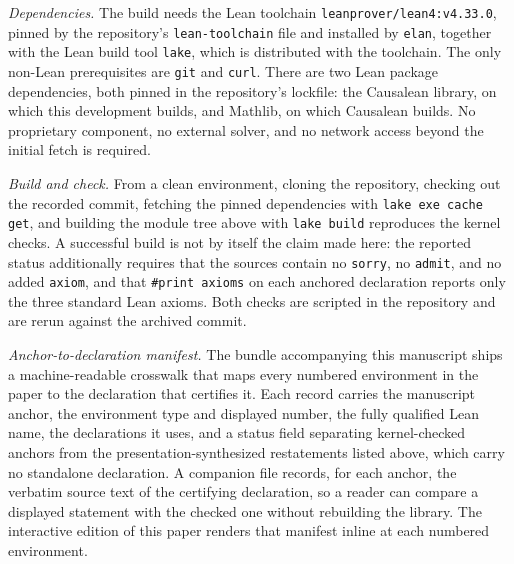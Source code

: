 \emph{Dependencies.}  The build needs the Lean toolchain \texttt{leanprover/lean4:v4.33.0}, pinned by the repository's \texttt{lean-toolchain} file and installed by \texttt{elan}, together with the Lean build tool \texttt{lake}, which is distributed with the toolchain.  The only non-Lean prerequisites are \texttt{git} and \texttt{curl}.  There are two Lean package dependencies, both pinned in the repository's lockfile: the Causalean library, on which this development builds, and Mathlib, on which Causalean builds.  No proprietary component, no external solver, and no network access beyond the initial fetch is required.

\emph{Build and check.}  From a clean environment, cloning the repository, checking out the recorded commit, fetching the pinned dependencies with \texttt{lake exe cache get}, and building the module tree above with \texttt{lake build} reproduces the kernel checks.  A successful build is not by itself the claim made here: the reported status additionally requires that the sources contain no \texttt{sorry}, no \texttt{admit}, and no added \texttt{axiom}, and that \texttt{\#print axioms} on each anchored declaration reports only the three standard Lean axioms.  Both checks are scripted in the repository and are rerun against the archived commit.

\emph{Anchor-to-declaration manifest.}  The bundle accompanying this manuscript ships a machine-readable crosswalk that maps every numbered environment in the paper to the declaration that certifies it.  Each record carries the manuscript anchor, the environment type and displayed number, the fully qualified Lean name, the declarations it uses, and a status field separating kernel-checked anchors from the presentation-synthesized restatements listed above, which carry no standalone declaration.  A companion file records, for each anchor, the verbatim source text of the certifying declaration, so a reader can compare a displayed statement with the checked one without rebuilding the library.  The interactive edition of this paper renders that manifest inline at each numbered environment.
